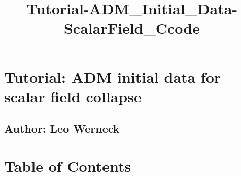 \documentclass[landscape,letterpaper,10pt,english]{article}
\title{Tutorial-ADM\_Initial\_Data-ScalarField\_Ccode}
\begin{document}
    
    \maketitle
    
    

    
    \hypertarget{tutorial-adm-initial-data-for-scalar-field-collapse}{%
\section{Tutorial: ADM initial data for scalar field
collapse}\label{tutorial-adm-initial-data-for-scalar-field-collapse}}

\hypertarget{author-leo-werneck}{%
\subsection{Author: Leo Werneck}\label{author-leo-werneck}}

    \hypertarget{table-of-contents}{%
\section{Table of Contents}\label{table-of-contents}}

\[\label{toc}\]
\end{document}
